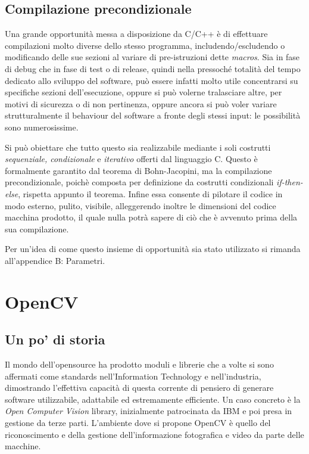 	\subsection{Compilazione precondizionale} %
Una grande opportunità messa a disposizione da C/C++ è di effettuare compilazioni molto diverse dello stesso programma, includendo/escludendo o modificando delle sue sezioni al variare di pre-istruzioni dette {\em macros}. Sia in fase di debug che in fase di test o di release, quindi nella pressoché totalità del tempo dedicato allo sviluppo del software, può essere infatti molto utile concentrarsi su specifiche sezioni dell'esecuzione, oppure si può volerne tralasciare altre, per motivi di sicurezza o di non pertinenza, oppure ancora si può voler variare strutturalmente il behaviour del software a fronte degli stessi input: le possibilità sono numerosissime. 

Si può obiettare che tutto questo sia realizzabile mediante i soli costrutti {\em sequenziale, condizionale} e {\em iterativo} offerti dal linguaggio C. Questo è formalmente garantito dal teorema di Bohn-Jacopini, ma la compilazione precondizionale, poichè composta per definizione da costrutti condizionali {\em if-then-else}, rispetta appunto il teorema. Infine essa consente di pilotare il codice in modo esterno, pulito, visibile, alleggerendo inoltre le dimensioni del codice macchina prodotto, il quale nulla potrà sapere di ciò che è avvenuto prima della sua compilazione.

Per un'idea di come questo insieme di opportunità sia stato utilizzato si rimanda all'appendice B: Parametri.
\section{OpenCV}
	\subsection{Un po' di storia}
Il mondo dell'opensource ha prodotto moduli e librerie che a volte si sono affermati come standards nell'Information Technology e nell'industria, dimostrando l'effettiva capacità di questa corrente di pensiero di generare software utilizzabile, adattabile ed estremamente efficiente. Un caso concreto è la {\em Open Computer Vision} library, inizialmente patrocinata da IBM e poi presa in gestione da terze parti.
L'ambiente dove si propone OpenCV è quello del riconoscimento e della gestione dell'informazione fotografica e video da parte delle macchine. 

